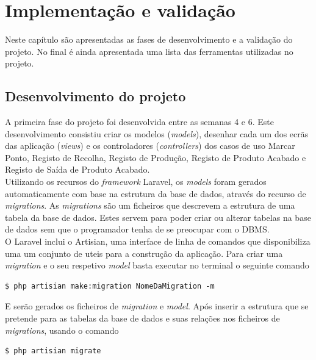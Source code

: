 \chapter{Implementação e validação} 
\label{cap:5}
Neste capítulo são apresentadas as fases de desenvolvimento e a validação do projeto. No final é ainda apresentada uma lista das ferramentas utilizadas no projeto.

\section{Desenvolvimento do projeto}
A primeira fase do projeto foi desenvolvida entre as semanas 4 e 6. Este desenvolvimento consistiu criar os modelos (\textit{models}), desenhar cada um dos ecrãs das aplicação (\textit{views}) e os controladores (\textit{controllers}) dos casos de uso Marcar Ponto, Registo de Recolha, Registo de Produção, Registo de Produto Acabado e Registo de Saída de Produto Acabado.\\
Utilizando os recursos do \textit{framework} Laravel, os \textit{models} foram gerados automaticamente com base na estrutura da base de dados, através do recurso de \textit{migrations}. As \textit{migrations} são um ficheiros que descrevem a estrutura de uma tabela da base de dados. Estes servem para poder criar ou alterar tabelas na base de dados sem que o programador tenha de se preocupar com o DBMS\label{sym:DBMG}.\\
O Laravel inclui o Artisian, uma interface de linha de comandos que disponibiliza uma um conjunto de uteis para a construção da aplicação\cite{Laravelb}.
Para criar uma \textit{migration} e o seu respetivo \textit{model} basta executar no terminal o seguinte comando

\begin{lstlisting}
$ php artisian make:migration NomeDaMigration -m
\end{lstlisting}

\noindent
E serão gerados os ficheiros de \textit{migration} e \textit{model}. Após inserir a estrutura que se pretende para as tabelas da base de dados e suas relações nos ficheiros de \textit{migrations}, usando o comando

\begin{lstlisting}
$ php artisian migrate
\end{lstlisting}

